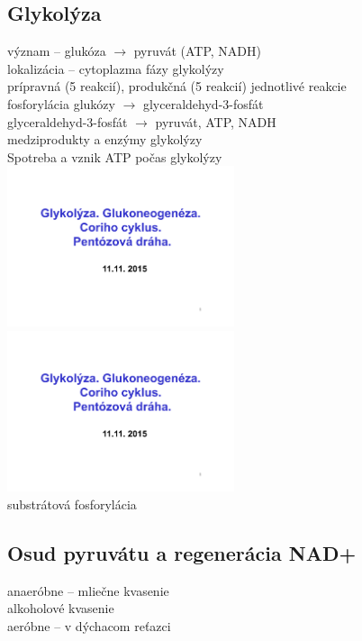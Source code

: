 \subsection{Glykolýza}
\tab význam -- glukóza $\rightarrow$ pyruvát (ATP, NADH)\\
\tab lokalizácia -- cytoplazma
 fázy glykolýzy\\
\tab \tab prípravná (5 reakcií), produkčná (5 reakcií)
\tab jednotlivé reakcie\\
\tab \tab fosforylácia glukózy $\rightarrow$ glyceraldehyd-3-fosfát\\
\tab \tab glyceraldehyd-3-fosfát $\rightarrow$ pyruvát, ATP, NADH\\
\tab medziprodukty a enzýmy glykolýzy\\
Spotreba a vznik ATP počas glykolýzy\\
\includegraphics[width=0.5\textwidth, page=6]{materials/Biochemia/Prezentacie_Biochemia/06_Glyko_Gluko_Pento.pdf}
\includegraphics[width=0.5\textwidth, page=7]{materials/Biochemia/Prezentacie_Biochemia/06_Glyko_Gluko_Pento.pdf}
\\
substrátová fosforylácia\\
\subsection{Osud pyruvátu a regenerácia NAD+}
anaeróbne -- mliečne kvasenie\\
alkoholové kvasenie\\
aeróbne -- v dýchacom reťazci\\
